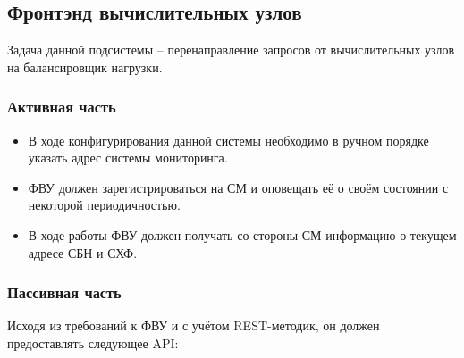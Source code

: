 \documentclass[a4paper,12pt]{report}
\numberwithin{equation}{section}
\begin{document}
  \subsection{Фронтэнд вычислительных узлов}
  Задача данной подсистемы -- перенаправление запросов от вычислительных узлов на балансировщик нагрузки.
  
  \subsubsection{Активная часть}
  \begin{itemize}
    \item В ходе конфигурирования данной системы необходимо в ручном порядке указать адрес системы мониторинга.
    \item ФВУ должен зарегистрироваться на СМ и оповещать её о своём состоянии с некоторой периодичностью.
    \item В ходе работы ФВУ должен получать со стороны СМ информацию о текущем адресе СБН и СХФ.
  \end{itemize}
  
  \subsubsection{Пассивная часть}
  Исходя из требований к ФВУ и с учётом REST-методик, он должен предоставлять следующее API:
  
\end{document}
